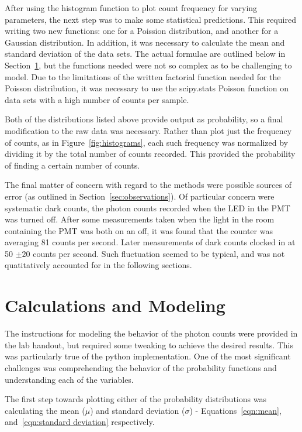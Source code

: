 \documentclass[a4paper,12pt]{article}
\begin{document}
After using the histogram function to plot count frequency for varying parameters, the next step was to make some statistical predictions. This required writing two new functions: one for a Poission distribution, and another for a Gaussian distribution. In addition, it was necessary to calculate the mean and standard deviation of the data sets. The actual formulae are outlined below in Section~\ref{sec:calculations}, but the functions needed were not so complex as to be challenging to model. Due to the limitations of the written factorial function needed for the Poisson distribution, it was necessary to use the scipy.stats Poisson function on data sets with a high number of counts per sample.

Both of the distributions listed above provide output as probability, so a final modification to the raw data was necessary. Rather than plot just the frequency of counts, as in Figure~\ref{fig:histograms}, each such frequency was normalized by dividing it by the total number of counts recorded. This provided the probability of finding a certain number of counts. 

The final matter of concern with regard to the methods were possible sources of error (as outlined in Section~\ref{sec:observations}). Of particular concern were systematic dark counts, the photon counts recorded when the LED in the PMT was turned off. After some measurements taken when the light in the room containing the PMT was both on an off, it was found that the counter was averaging 81 counts per second. Later measurements of dark counts clocked in at 50 $\pm{ 20}$ counts per second. Such fluctuation seemed to be typical, and was not quatitatively accounted for in the following sections.

\section{Calculations and Modeling}
\label{sec:calculations}

The instructions for modeling the behavior of the photon counts were provided in the lab handout, but required some tweaking to achieve the desired results. This was  particularly true of the python implementation. One of the most significant challenges was comprehending the behavior of the probability functions and understanding each of the variables.

The first step towards plotting either of the probability distributions was calculating the mean ($\mu$) and standard deviation ($\sigma$) - Equations~\ref{eqn:mean}, and~\ref{eqn:standard deviation} respectively. 
\end{document}
